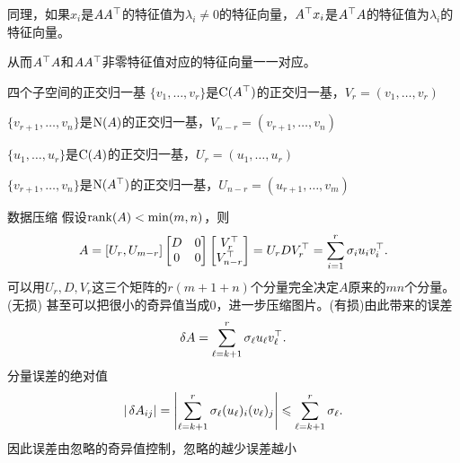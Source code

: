 同理，如果$x_i$是$AA^\top$的特征值为$\lambda_i\neq 0$的特征向量，$A^\top x_i$是$A^\top A$的特征值为$\lambda_i$的特征向量。

从而$A^\top A$和$AA^\top$非零特征值对应的特征向量一一对应。
\begin{example}{四个子空间的正交归一基}{}
	$\{v_1,\ldots,v_r\}$是$\operatorname{C}(A^\top)$的正交归一基，$V_r=(v_1,\ldots,v_r)$

	$\{v_{r+1},\ldots,v_n\}$是$\operatorname{N}(A)$的正交归一基，$V_{n-r}=(v_{r+1},\ldots,v_n)$

	$\{u_1,\ldots,u_r\}$是$\operatorname{C}(A)$的正交归一基，$U_r=(u_1,\ldots,u_r)$

	$\{v_{r+1},\ldots,v_n\}$是$\operatorname{N}(A^\top)$的正交归一基，$U_{n-r}=(u_{r+1},\ldots,v_m)$
\end{example}
\begin{example}{数据压缩}{}
	假设$\operatorname{rank}(A)<\min(m,n)$，则 
	\[
		A=[U_r,U_{m-r}]\begin{bmatrix}
			D&0\\0&0
		\end{bmatrix}\begin{bmatrix}
			V_r^\top\\V_{n-r}^\top
		\end{bmatrix}=U_rDV_r^\top=\sum_{i=1}^r\sigma_iu_iv_i^\top.
	\]
	可以用$U_r,D,V_r$这三个矩阵的$r(m+1+n)$个分量完全决定$A$原来的$mn$个分量。(无损)
	\tcblower
	甚至可以把很小的奇异值当成0，进一步压缩图片。(有损)由此带来的误差
	\[
		\mathop{}\!\delta A=\sum_{\ell=k+1}^r\sigma_\ell u_\ell v_\ell^\top.
	\]
	分量误差的绝对值
	\[
		|\mathop{}\!\delta A_{ij}|=\left\lvert\sum_{\ell=k+1}^r\sigma_\ell (u_\ell)_i (v_\ell)_j\right\rvert\leqslant\sum_{\ell=k+1}^r\sigma_\ell.
	\]
	因此误差由忽略的奇异值控制，忽略的越少误差越小
\end{example}
